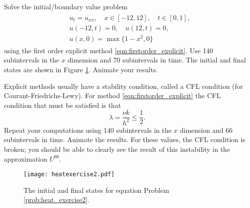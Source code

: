 \begin{problem}
\label{prob:heat_exercise2}
Solve the initial/boundary value problem
\begin{align}
	\begin{split}
	&{ } u_t = u_{xx}, \quad x \in [-12,12],\quad t \in [0,1], \\
	&{ } u(-12,t) = 0,\quad u(12,t) = 0,\\
	&{ } u(x,0) = \max\{1 - x^2,0\}
	\end{split}
\end{align}
using the first order explicit method \ref{eqn:firstorder_explicit}.
Use 140 subintervals in the $x$ dimension and 70 subintervals in time.
The initial and final states are shown in Figure \ref{fig:heatexercise2}.
Animate your results.

Explicit methods usually have a stability condition, called a CFL condition (for Courant-Friedrichs-Lewy).
For method \ref{eqn:firstorder_explicit} the CFL condition that must be satisfied is that
\[\lambda=\frac{\nu k}{h^2} \leq \frac{1}{2}.\]
Repeat your computations using 140 subintervals in the $x$ dimension and 66 subintervals in time. Animate the results.
For these values, the CFL condition is broken; you should be able to clearly see the result of this instability in the approximation $U^{66}$.
\end{problem}

\begin{figure}
\centering
\texttt{[image: heatexercise2.pdf]}
\caption{The initial and final states for equation Problem \ref{prob:heat_exercise2}.}
\label{fig:heatexercise2}
\end{figure}

